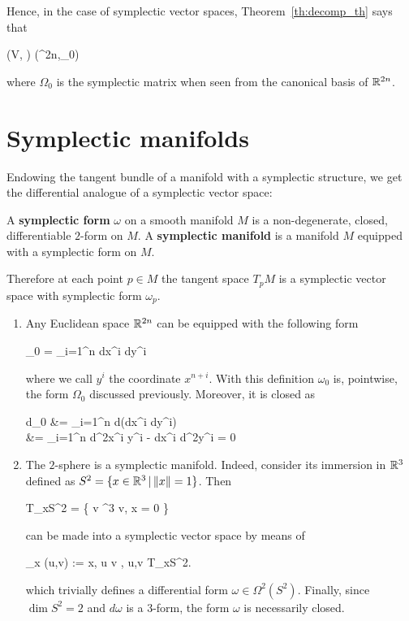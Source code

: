 \documentclass[main.tex]{subfiles}
\begin{document}
Hence, in the case of symplectic vector spaces, Theorem~\ref{th:decomp_th} says that
\begin{eqalign}
	(V, \Omega) \iso (\R^{2n},\Omega_0)
\end{eqalign}
where $\Omega_0$ is the symplectic matrix when seen from the canonical basis of $\mathbb{R}^{2n}$.

\section{Symplectic manifolds}
Endowing the tangent bundle of a manifold with a symplectic structure, we get the differential analogue of a symplectic vector space:

\begin{definition}
	A \textbf{symplectic form} $\omega$ on a smooth manifold $M$ is a non-degenerate\footnotemark, closed, differentiable $2$-form on $M$. A \textbf{symplectic manifold} is a manifold $M$ equipped with a symplectic form on $M$.
\end{definition}

Therefore at each point $p \in M$ the tangent space $T_pM$ is a symplectic vector space with symplectic form $\omega_p$.

\begin{example}
\label{ex:eu_sp_sphere}
	\leavevmode
	\begin{enumerate}
		\item Any Euclidean space $\mathbb{R}^{2n}$ can be equipped with the following form
		\begin{eqalign}
			\omega_0 = \sum_{i=1}^n dx^i \wedge dy^i
		\end{eqalign}
		where we call $y^i$ the coordinate $x^{n+i}$. With this definition $\omega_0$ is, pointwise, the form $\Omega_0$ discussed previously. Moreover, it is closed as
		\begin{eqalign}
			d\omega_0 &= \sum_{i=1}^n d(dx^i \wedge dy^i)\\
			&= \sum_{i=1}^n d^2x^i \wedge y^i - dx^i \wedge d^2y^i = 0
		\end{eqalign}
		\item The $2$-sphere is a symplectic manifold. Indeed, consider its immersion in $\mathbb{R}^3$ defined as $S^2 = \{ x \in \mathbb{R}^3 \,|\, \|x\| = 1\}$. Then
		\begin{eqalign}
			T_xS^2 = \{ v \in \R^3 \suchthat \langle v, x \rangle = 0 \}
		\end{eqalign}
		can be made into a symplectic vector space by means of
		\begin{eqalign}
			\omega_x (u,v) := \langle x, u \times v \rangle, \quad \forall u,v \in T_xS^2.
		\end{eqalign}
		which trivially defines a differential form $\omega \in \Omega^2(S^2)$. Finally, since $\dim S^2 = 2$ and $d\omega$ is a 3-form, the form $\omega$ is necessarily closed.
	\end{enumerate}
\end{example}
\end{document}

